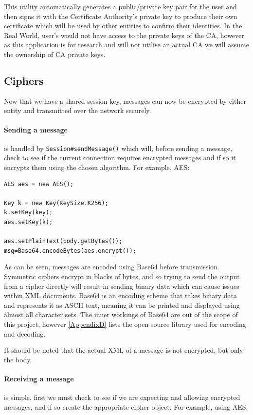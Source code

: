   This utility automatically generates a public/private key pair for the user and then signs it with the Certificate Authority's private key to produce their own certificate which will be used by other entities to confirm their identities. In the Real World, user's would not have access to the private keys of the CA, however as this application is for research and will not utilise an actual CA we will assume the ownership of CA private keys.
  
  \subsection{Ciphers}
  
  Now that we have a shared session key, messages can now be encrypted by either entity and transmitted over the network securely. 
  
  \paragraph{Sending a message} is handled by \verb!Session#sendMessage()! which will, before sending a message, check to see if the current connection requires encrypted messages and if so it encrypts them using the chosen algorithm. For example, AES: \\
  
  \begin{lstlisting}
AES aes = new AES();
				
Key k = new Key(KeySize.K256);
k.setKey(key);
aes.setKey(k);
			
aes.setPlainText(body.getBytes());
msg=Base64.encodeBytes(aes.encrypt());
\end{lstlisting}

  As can be seen, messages are encoded using Base64 before transmission. Symmetric ciphers encrypt in blocks of bytes, and so trying to send the output from a cipher directly will result in sending binary data which can cause issues within XML documents. Base64 is an encoding scheme that takes binary data and represents it as ASCII text, meaning it can be printed and displayed using almost all character sets. The inner workings of Base64 are out of the scope of this project, however \textsection\ref{AppendixD} lists the open source library used for encoding and decoding.
  
  It should be noted that the actual XML of a message is not encrypted, but only the body.
  
  \paragraph{Receiving a message} is simple, first we must check to see if we are expecting and allowing encrypted messages, and if so create the appropriate cipher object. For example, using AES: \\
  
